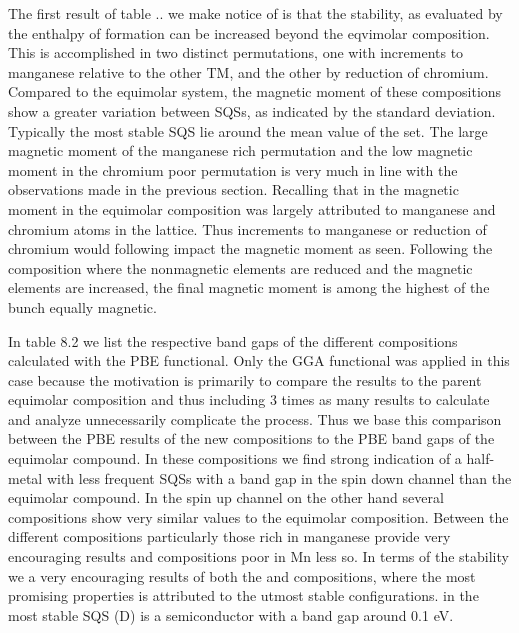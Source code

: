 The first result of table .. we make notice of is that the stability, as evaluated by the enthalpy of formation can be increased beyond the eqvimolar composition. This is accomplished in two distinct permutations, one with increments to  manganese relative to the other TM, and the other by reduction of chromium. Compared to the equimolar system, the magnetic moment of these compositions show a greater variation between SQSs, as indicated by the standard deviation. Typically the most stable SQS lie around the mean value of the set. The large magnetic moment of the manganese rich permutation and the low magnetic moment in the chromium poor permutation is very much in line with the observations made in the previous section. Recalling that in the magnetic moment in the equimolar composition was largely attributed to manganese and chromium atoms in the lattice. Thus increments to manganese or reduction of chromium would following impact the magnetic moment as seen. Following the composition  where the nonmagnetic elements are reduced and the magnetic elements are increased, the final magnetic moment is among the highest of the bunch equally magnetic. 

In table 8.2 we list the respective band gaps of the different compositions calculated with the PBE functional. Only the GGA functional was applied in this case because the motivation is primarily to compare the results to the parent equimolar composition and thus including 3 times as many results to calculate and analyze unnecessarily complicate the process. Thus we base this comparison between the PBE results of the new compositions to the PBE band gaps of the equimolar compound. In these compositions we find strong indication of a half-metal with less frequent SQSs with a band gap in the spin down channel than the equimolar compound. In the spin up channel on the other hand several compositions show very similar values to the equimolar composition. Between the different compositions particularly those rich in manganese provide very encouraging results and compositions poor in Mn less so. In terms of the stability we a very encouraging results of both the  and  compositions, where the most promising properties is attributed to the utmost stable configurations.  in  the most stable SQS (D) is a semiconductor with a band gap around 0.1 eV.

